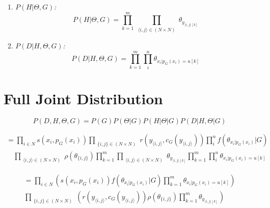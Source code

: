 \documentclass[]{article}
\begin{document}
\begin{enumerate}
\item \textit{$P(H | \Theta, G) $:}
\begin{equation}\label{eq:equation9}
P(H | \Theta, G) = \prod_{k=1}^{m} \prod_{\substack{ 
															\langle i,j\rangle \in \left(N \times N\right)}}
															\theta_{y_{\langle i,j\rangle\left[ k \right]}}
\end{equation}

\item \textit{$P(D|H, \Theta, G) $:}
\begin{equation}\label{eq:equation10}
P(D|H, \Theta, G) = \prod_{k=1}^{m} \prod_i^{n}  \theta_{x_i | p_G \left( x_i \right)= u\left[ k \right] } 
\end{equation}


\end{enumerate}

\section{Full Joint Distribution}
\begin{equation}\label{eq:equation11}
P(D, H, \Theta, G)= P(G)P(\Theta|G)P(H |\Theta|G)P(D | H,\Theta|G)
\end{equation}

\begin{equation}
\begin{split}
							= \prod_{i \in N }  
														s\left(x_i, p_G\left( x_i \right)\right)   
												\prod_{\substack{ 
															\lbrace i,j \rbrace \in \left(N \times N\right)  } }   
												 		r\left( y_{\langle i,j\rangle} , c_G\left( y_{\langle i,j\rangle}  \right)\right)
								\prod_i^{n} f( \theta_{x_i | p_G \left( x_i \right) } | G ) \\
								\quad								
								\prod_{\substack{ 
											\langle i,j\rangle \in \left(N \times N\right)}} 
											\rho \left( \theta_{\lbrace i, j \rbrace} \right)							
								\prod_{k=1}^{m} \prod_{\substack{ 
															\langle i,j\rangle \in \left(N \times N\right)}}
															\theta_{y_{\langle i,j\rangle\left[ k \right]}}
								\prod_{k=1}^{m} \prod_i^{n}  \theta_{x_i | p_G \left( x_i \right)= u\left[ k \right] } 
\end{split}
\end{equation}

\begin{equation}
\begin{split}
							= \prod_{i \in N } 
									\left( 
											s\left(x_i, p_G\left( x_i \right)\right)    f( \theta_{x_i | p_G \left( x_i \right) } | G )\prod_{k=1}^{m} \theta_{x_i | p_G \left( x_i \right)= u\left[ k \right] } 
									\right)\\
								\prod_{\substack{ 
												\lbrace i,j \rbrace \in \left(N \times N\right)  } } 
									\left(  
												r\left( y_{\langle i,j\rangle} , c_G\left( y_{\langle i,j\rangle}  \right)\right)							
												\rho \left( \theta_{\lbrace i, j \rbrace} \right)							
								\prod_{k=1}^{m} \theta_{y_{\langle i,j\rangle\left[ k \right]}}\right)								
\end{split}
\end{equation}
\end{document}
